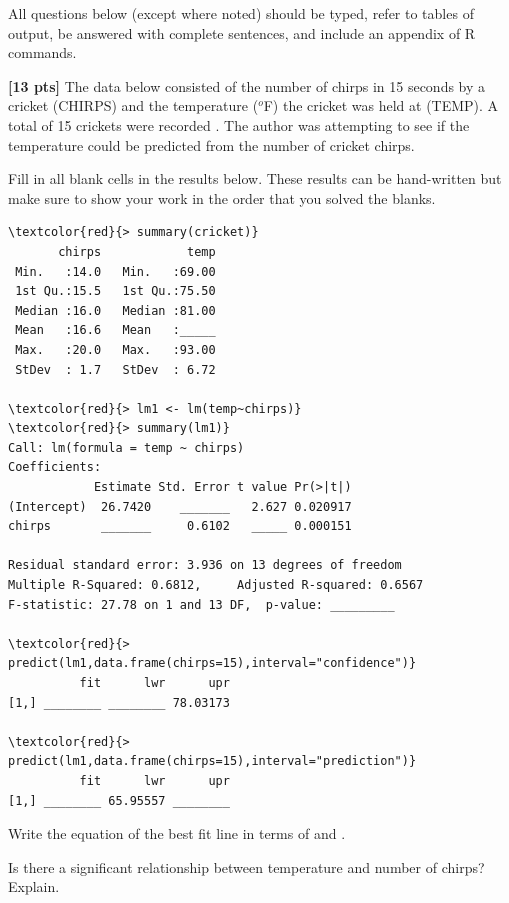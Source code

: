 \documentclass[10pt,openany]{book}\usepackage[]{graphicx}\usepackage[]{color}
\begin{document}
\begin{hwsection}{All questions below (except where noted) should be typed, refer to tables of output, be answered with complete sentences, and include an appendix of R commands.}

  \item \label{hwprob:LMSLR1} \textbf{[13 pts]} The data below consisted of the number of chirps in 15 seconds by a cricket (CHIRPS) and the temperature ($^{o}$F) the cricket was held at (TEMP). A total of 15 crickets were recorded \citep{Pierce1948}.  The author was attempting to see if the temperature could be predicted from the number of cricket chirps.

    \begin{Enumerate}
      \item Fill in all blank cells in the results below.  These results can be hand-written but make sure to show your work in the order that you solved the blanks.

  \begin{Verbatim}[formatcom=\color{blue},xleftmargin=5mm,commandchars=\\\{\}]
\textcolor{red}{> summary(cricket)}
       chirps            temp
 Min.   :14.0   Min.   :69.00
 1st Qu.:15.5   1st Qu.:75.50
 Median :16.0   Median :81.00
 Mean   :16.6   Mean   :_____
 Max.   :20.0   Max.   :93.00
 StDev  : 1.7   StDev  : 6.72

\textcolor{red}{> lm1 <- lm(temp~chirps)}
\textcolor{red}{> summary(lm1)}
Call: lm(formula = temp ~ chirps)
Coefficients:
            Estimate Std. Error t value Pr(>|t|)
(Intercept)  26.7420    _______   2.627 0.020917
chirps       _______     0.6102   _____ 0.000151

Residual standard error: 3.936 on 13 degrees of freedom
Multiple R-Squared: 0.6812,     Adjusted R-squared: 0.6567
F-statistic: 27.78 on 1 and 13 DF,  p-value: _________

\textcolor{red}{> predict(lm1,data.frame(chirps=15),interval="confidence")}
          fit      lwr      upr
[1,] ________ ________ 78.03173

\textcolor{red}{> predict(lm1,data.frame(chirps=15),interval="prediction")}
          fit      lwr      upr
[1,] ________ 65.95557 ________
\end{Verbatim}

\vspace{12pt}
      \item Write the equation of the best fit line in terms of  and .
      \item Is there a significant relationship between temperature and number of chirps? Explain.
    \end{Enumerate}


\end{hwsection}
\end{document}
